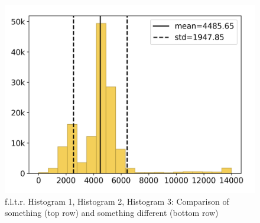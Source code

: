\begin{figure}[H]
\begin{minipage}{.325\textwidth}
		\includegraphics[width=\textwidth, trim=.25cm 0.25cm .25cm 0.25cm]{Resources/Images/Histogram/hist_3_b.png}
	\end{minipage}
	\caption{f.l.t.r. Histogram 1, Histogram 2, Histogram 3: Comparison of something (top row) and something different (bottom row)}
	\label{fig:images:histograms}
\end{figure}

